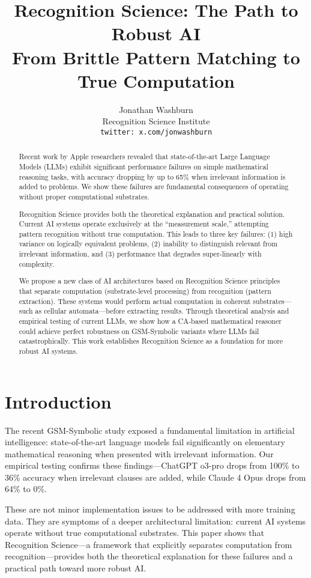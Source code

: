 \documentclass[11pt,letterpaper]{article}
\title{Recognition Science: The Path to Robust AI\\
\Large From Brittle Pattern Matching to True Computation}
\author{
Jonathan Washburn\\
Recognition Science Institute\\
\texttt{twitter: x.com/jonwashburn}
}
\theoremstyle{plain}
\theoremstyle{definition}
\theoremstyle{remark}
\begin{document}
\maketitle

\begin{abstract}
Recent work by Apple researchers revealed that state-of-the-art Large Language Models (LLMs) exhibit significant performance failures on simple mathematical reasoning tasks, with accuracy dropping by up to 65\% when irrelevant information is added to problems. We show these failures are fundamental consequences of operating without proper computational substrates. 

Recognition Science provides both the theoretical explanation and practical solution. Current AI systems operate exclusively at the ``measurement scale,'' attempting pattern recognition without true computation. This leads to three key failures: (1) high variance on logically equivalent problems, (2) inability to distinguish relevant from irrelevant information, and (3) performance that degrades super-linearly with complexity.

We propose a new class of AI architectures based on Recognition Science principles that separate computation (substrate-level processing) from recognition (pattern extraction). These systems would perform actual computation in coherent substrates—such as cellular automata—before extracting results. Through theoretical analysis and empirical testing of current LLMs, we show how a CA-based mathematical reasoner could achieve perfect robustness on GSM-Symbolic variants where LLMs fail catastrophically. This work establishes Recognition Science as a foundation for more robust AI systems.
\end{abstract}

\section{Introduction}

The recent GSM-Symbolic study \cite{mirzadeh2024gsm} exposed a fundamental limitation in artificial intelligence: state-of-the-art language models fail significantly on elementary mathematical reasoning when presented with irrelevant information. Our empirical testing confirms these findings—ChatGPT o3-pro drops from 100\% to 36\% accuracy when irrelevant clauses are added, while Claude 4 Opus drops from 64\% to 0\%.

These are not minor implementation issues to be addressed with more training data. They are symptoms of a deeper architectural limitation: current AI systems operate without true computational substrates. This paper shows that Recognition Science—a framework that explicitly separates computation from recognition—provides both the theoretical explanation for these failures and a practical path toward more robust AI.
\end{document}
